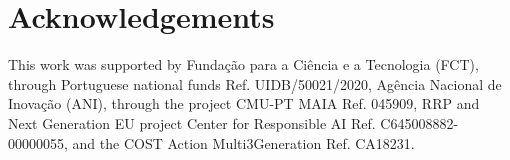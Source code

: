 \documentclass[11pt]{article}
\begin{document}
\section{Acknowledgements}

This work was supported by Fundação para a Ciência e a Tecnologia (FCT), through Portuguese national funds Ref. UIDB/50021/2020, Agência Nacional de Inovação (ANI), through the project CMU-PT MAIA Ref. 045909, RRP and Next Generation EU project Center for Responsible AI Ref. C645008882-00000055, and the COST Action Multi3Generation Ref. CA18231.







\end{document}
